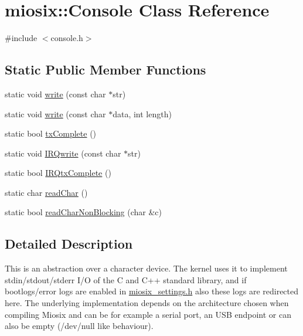 \hypertarget{classmiosix_1_1_console}{\section{miosix\-:\-:Console Class Reference}
\label{classmiosix_1_1_console}
}


{\ttfamily \#include $<$console.\-h$>$}

\subsection*{Static Public Member Functions}
\begin{DoxyCompactItemize}
\item 
static void \hyperlink{classmiosix_1_1_console_a054b46ab1923cda07ce0d0ec7ba49f89}{write} (const char $\ast$str)
\item 
static void \hyperlink{classmiosix_1_1_console_a92f437e13b5516f69ac811df412758a1}{write} (const char $\ast$data, int length)
\item 
static bool \hyperlink{classmiosix_1_1_console_a2ac9268ab624c70c04cf900db1f8d966}{tx\-Complete} ()
\item 
static void \hyperlink{classmiosix_1_1_console_a9bc2317a36cb7658d4794e534d67cbab}{I\-R\-Qwrite} (const char $\ast$str)
\item 
static bool \hyperlink{classmiosix_1_1_console_a4b7fe44888e16fbbb1b9f0a148e9d283}{I\-R\-Qtx\-Complete} ()
\item 
static char \hyperlink{classmiosix_1_1_console_af0dab4d3d7b559382f9f538024a21e5d}{read\-Char} ()
\item 
static bool \hyperlink{classmiosix_1_1_console_a6f92f4f087946ce225fe102a8b4154dd}{read\-Char\-Non\-Blocking} (char \&c)
\end{DoxyCompactItemize}


\subsection{Detailed Description}
This is an abstraction over a character device. The kernel uses it to implement stdin/stdout/stderr I/\-O of the C and C++ standard library, and if bootlogs/error logs are enabled in \hyperlink{miosix__settings_8h}{miosix\-\_\-settings.\-h} also these logs are redirected here. The underlying implementation depends on the architecture chosen when compiling Miosix and can be for example a serial port, an U\-S\-B endpoint or can also be empty (/dev/null like behaviour).

